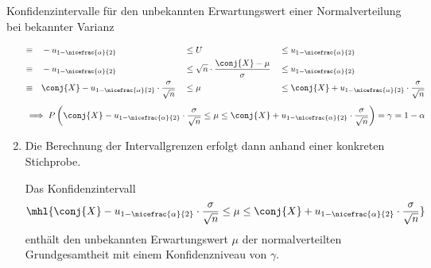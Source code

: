 \begin{algo}{Konfidenzintervalle für den unbekannten Erwartungswert einer Normalverteilung bei bekannter Varianz}
\begin{enumerate}
\begin{alignat*}{3}
                  \equiv \quad & -u_{1 - \nicefrac{\alpha}{2}}                                         &  & \leq U                                            &  & \leq u_{1 - \nicefrac{\alpha}{2}}                                          \\
                  \equiv \quad & -u_{1 - \nicefrac{\alpha}{2}}                                         &  & \leq \sqrt{n} \cdot \frac{\conj{X} - \mu}{\sigma} &  & \leq u_{1 - \nicefrac{\alpha}{2}}                                          \\
                  \equiv \quad & \conj{X} - u_{1 - \nicefrac{\alpha}{2}} \cdot \frac{\sigma}{\sqrt{n}} &  & \leq \mu                                          &  & \leq \conj{X} + u_{1 - \nicefrac{\alpha}{2}} \cdot \frac{\sigma}{\sqrt{n}}
              \end{alignat*}
              \[
                  \implies P \left( \conj{X} - u_{1 - \nicefrac{\alpha}{2}} \cdot \frac{\sigma}{\sqrt{n}} \leq \mu \leq \conj{X} + u_{1 - \nicefrac{\alpha}{2}} \cdot \frac{\sigma}{\sqrt{n}} \right) = \gamma = 1 - \alpha
              \]
        \item Die Berechnung der Intervallgrenzen erfolgt dann anhand einer konkreten Stichprobe.

              Das Konfidenzintervall
              \[
                  \mhl{\conj{X} - u_{1 - \nicefrac{\alpha}{2}} \cdot \frac{\sigma}{\sqrt{n}} \leq \mu \leq \conj{X} + u_{1 - \nicefrac{\alpha}{2}} \cdot \frac{\sigma}{\sqrt{n}}}
              \]
              enthält den unbekannten Erwartungswert $\mu$ der normalverteilten Grundgesamtheit mit einem Konfidenzniveau von $\gamma$.
    \end{enumerate}
\end{algo}

